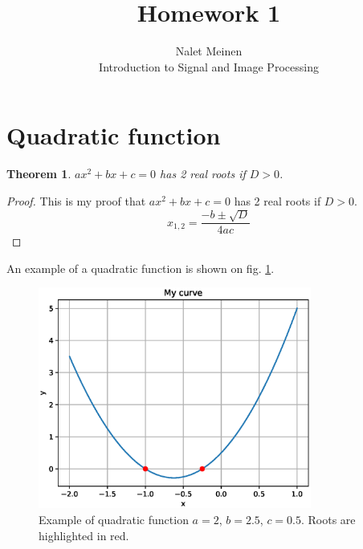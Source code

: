 \documentclass[12pt]{article}
\begin{document}


\title{Homework 1}%
\author{Nalet Meinen\\ %
Introduction to Signal and Image Processing
}

\maketitle

\section{Quadratic function}
\newtheorem{thm}{Theorem}
\begin{thm}
$ax^2+bx+c=0$ has 2 real roots if $D>0$.
\end{thm}

\begin{proof}
This is my proof that $ax^2+bx+c=0$ has 2 real roots if $D>0$.
\[
x_{1,2}=\frac{-b\pm\sqrt{D}}{4ac}
\]
\end{proof}

An example of a quadratic function is shown on fig. \ref{fig:q1}.

\begin{figure}
\centering
\includegraphics[width=0.8\textwidth]{pics/q1}
\caption{Example of quadratic function $a=2$, $b=2.5$, $c=0.5$. Roots are highlighted in red.}
\label{fig:q1}
\end{figure}
\end{document}
